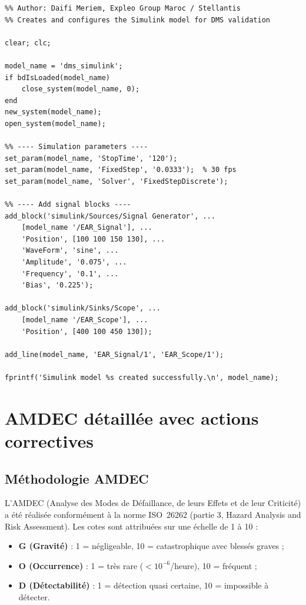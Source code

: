 \documentclass[12pt,a4paper]{report}
\begin{document}
\begin{lstlisting}[style=matlab, caption={dms\_simulink\_model.m -- configuration Simulink},
  label=lst:simulink]
%% DMS Simulink Model Setup Script
%% Author: Daifi Meriem, Expleo Group Maroc / Stellantis
%% Creates and configures the Simulink model for DMS validation

clear; clc;

model_name = 'dms_simulink';
if bdIsLoaded(model_name)
    close_system(model_name, 0);
end
new_system(model_name);
open_system(model_name);

%% ---- Simulation parameters ----
set_param(model_name, 'StopTime', '120');
set_param(model_name, 'FixedStep', '0.0333');  % 30 fps
set_param(model_name, 'Solver', 'FixedStepDiscrete');

%% ---- Add signal blocks ----
add_block('simulink/Sources/Signal Generator', ...
    [model_name '/EAR_Signal'], ...
    'Position', [100 100 150 130], ...
    'WaveForm', 'sine', ...
    'Amplitude', '0.075', ...
    'Frequency', '0.1', ...
    'Bias', '0.225');

add_block('simulink/Sinks/Scope', ...
    [model_name '/EAR_Scope'], ...
    'Position', [400 100 450 130]);

add_line(model_name, 'EAR_Signal/1', 'EAR_Scope/1');

fprintf('Simulink model %s created successfully.\n', model_name);
\end{lstlisting}

\clearpage

\chapter{AMDEC d\'etaill\'ee avec actions correctives}

\section{M\'ethodologie AMDEC}

L'AMDEC (Analyse des Modes de D\'efaillance, de leurs Effets et de leur Criticit\'e) a \'et\'e r\'ealis\'ee conform\'ement \`a la norme ISO~26262 (partie 3, Hazard Analysis and Risk Assessment). Les cotes sont attribu\'ees sur une \'echelle de 1 \`a 10 :
\begin{itemize}
  \item \textbf{G (Gravit\'e)} : 1 = n\'egligeable, 10 = catastrophique avec bless\'es graves ;
  \item \textbf{O (Occurrence)} : 1 = tr\`es rare ($< 10^{-6}$/heure), 10 = fr\'equent ;
  \item \textbf{D (D\'etectabilit\'e)} : 1 = d\'etection quasi certaine, 10 = impossible \`a d\'etecter.
\end{itemize}
\end{document}
